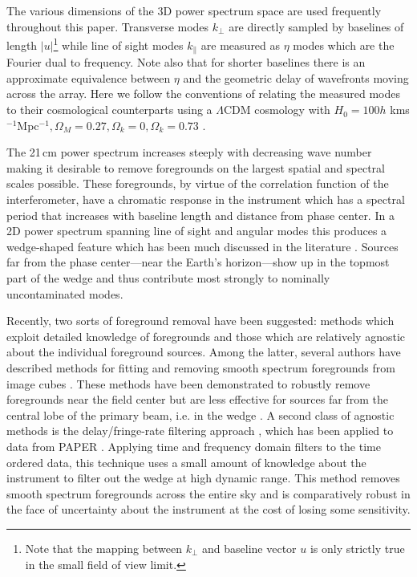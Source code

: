 \documentclass[twolcolumn,iop]{emulateapj}
\begin{document}
 The various dimensions of the 3D power spectrum space are used frequently throughout this paper.  Transverse modes $k_\perp$ are directly sampled by baselines of length $|u|$\footnote{Note that the mapping between $k_\perp$ and baseline vector $u$ is only strictly true in the small field of view limit.} while line of sight modes $k_\parallel$ are measured as $\eta$ modes which are the Fourier dual to frequency. Note also that for shorter baselines there is an approximate equivalence between $\eta$ and the geometric delay of wavefronts moving across the array. Here we follow the conventions of \cite{Furlanetto:2006p2267} relating the measured modes to their cosmological counterparts using  a $\Lambda$CDM cosmology with $H_0=100h$ kms$^{-1}$Mpc$^{-1}, \Omega_M=0.27,\Omega_k=0, \Omega_k=0.73$ \citep{2013ApJS..208...19H_wmap9_parameters}. 

The 21\,cm power spectrum increases steeply with decreasing wave number making it desirable to remove foregrounds on the largest spatial and spectral scales possible.   These foregrounds, by virtue of the correlation function of the interferometer, have a chromatic response in the instrument which has a spectral period that increases with baseline length and distance from phase center. In a 2D power spectrum spanning line of sight and angular modes this produces a wedge-shaped feature which has been much discussed in the literature \cite{Datta:2010p8781,Vedantham:2012p10297,Parsons:2012p8896,Pober:2013p9942,Morales:2012p8790,2014PhRvD..90b3018L,2014PhRvD..90b3019L,2015PhRvD..91b3002D,Trott:2012p10466,2015ApJ...804...14T}. Sources far from the phase center---near the Earth's horizon---show up in the topmost part of the wedge and thus contribute most strongly to nominally uncontaminated modes.   


 Recently, two sorts of foreground removal have been suggested: methods which exploit detailed knowledge of foregrounds and those which are relatively agnostic about the individual foreground sources. Among the latter, several authors have described methods for fitting and removing smooth spectrum foregrounds from image cubes  \cite{Morales:2006p1903,Bowman:2009p7816,Liu:2009p4762,Liu:2011p8763,2012MNRAS.Chapman.423.2518C,Chapman:2013p10379,Dillon:2013p10497,Yatawatta:2013p9699}. These methods have been demonstrated to robustly remove foregrounds near the field center but are less effective for sources far from the central lobe of the primary beam, i.e. in the wedge \citep{2015ApJ...804...14T,2015ApJ...807L..28T,Pober:2016ApJ...819....8P}.  A second class of agnostic methods is the delay/fringe-rate filtering approach \citep{Parsons:2012p8896,2014PhRvD..90b3018L,2014PhRvD..90b3019L}, which has been applied to data from PAPER \citep{Parsons:2014p10499,	2015ApJ...809...61A,2015ApJ...801...51J}.  Applying time and frequency domain filters to the time ordered data, this technique uses a small amount of knowledge about the instrument to filter out the wedge at high dynamic range.  This method removes smooth spectrum foregrounds across the entire sky and is comparatively robust in the face of uncertainty about the instrument at the cost of losing some sensitivity.  
 
\end{document}
